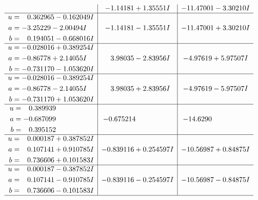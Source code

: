 \documentclass[1p]{elsarticle_modified}
\theoremstyle{definition}
\begin{document}
$$\begin{array}{c|c|c}
 & -1.14181 + 1.35551 I & -11.47001 - 3.30210 I \\ \hline\begin{aligned}
u &= \phantom{-}0.362965 - 0.162049 I \\
a &= -3.25229 - 2.00494 I \\
b &= \phantom{-}0.194051 - 0.668016 I\end{aligned}
 & -1.14181 - 1.35551 I & -11.47001 + 3.30210 I \\ \hline\begin{aligned}
u &= -0.028016 + 0.389254 I \\
a &= -0.86778 + 2.14055 I \\
b &= -0.731170 - 1.053620 I\end{aligned}
 & \phantom{-}3.98035 - 2.83956 I & -4.97619 + 5.97507 I \\ \hline\begin{aligned}
u &= -0.028016 - 0.389254 I \\
a &= -0.86778 - 2.14055 I \\
b &= -0.731170 + 1.053620 I\end{aligned}
 & \phantom{-}3.98035 + 2.83956 I & -4.97619 - 5.97507 I \\ \hline\begin{aligned}
u &= \phantom{-}0.389939\phantom{ +0.000000I} \\
a &= -0.687099\phantom{ +0.000000I} \\
b &= \phantom{-}0.395152\phantom{ +0.000000I}\end{aligned}
 & -0.675214\phantom{ +0.000000I} & -14.6290\phantom{ +0.000000I} \\ \hline\begin{aligned}
u &= \phantom{-}0.000187 + 0.387852 I \\
a &= \phantom{-}0.107141 + 0.910785 I \\
b &= \phantom{-}0.736606 + 0.101583 I\end{aligned}
 & -0.839116 + 0.254597 I & -10.56987 + 0.84875 I \\ \hline\begin{aligned}
u &= \phantom{-}0.000187 - 0.387852 I \\
a &= \phantom{-}0.107141 - 0.910785 I \\
b &= \phantom{-}0.736606 - 0.101583 I\end{aligned}
 & -0.839116 - 0.254597 I & -10.56987 - 0.84875 I\\
 \hline 
 \end{array}$$\newpage$$\begin{array}{c|c|c}  

\end{array}$$
\end{document}
